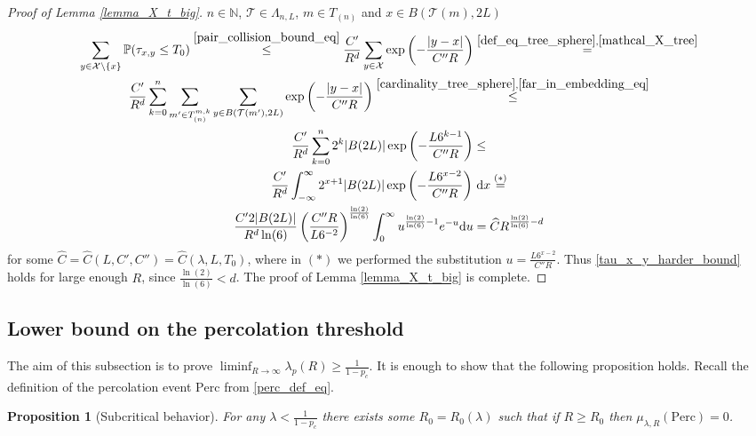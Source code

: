 \documentclass[a4paper,12pt]{article}
\newtheorem  {proposition}   [theorem]{Proposition}
\begin{document}
\begin{proof}[Proof of Lemma \ref{lemma_X_t_big}]
$n \in \mathbb{N}$, $\mathcal{T} \in \Lambda_{n,L}$, $m  \in T_{(n)}$ and  $x \in B( \mathcal{T}(m),2L)$
\begin{multline}\label{first_ln2_ln_6}
\sum_{y \in \mathcal{X}\setminus \{ x \} }   \mathbb{P}(\tau_{x,y} \leq T_0 ) \stackrel{ \eqref{pair_collision_bound_eq} }{\leq}
 \frac{C'}{R^{d}} \sum_{y \in \mathcal{X} }    \exp\left(  -  \frac{|y-x|}{C'' R } \right)
 \stackrel{ \eqref{def_eq_tree_sphere}, \eqref{mathcal_X_tree}  }{=}
  \\
\frac{C'}{R^{d}} \sum_{k=0}^n \sum_{m' \in T_{(n)}^{m,k} } \sum_{y \in B( \mathcal{T}(m'),2L)  }  \exp\left(  -  \frac{|y-x|}{C'' R } \right)
\stackrel{ \eqref{cardinality_tree_sphere}, \eqref{far_in_embedding_eq} }{\leq} \\
\frac{C'}{R^{d}} \sum_{k=0}^n 2^{k} |B(2L)|  \exp\left(  -  \frac{L 6^{k-1} }{C'' R } \right)
\leq \\
\frac{C' }{R^{d}} \int_{-\infty}^\infty 2^{x+1}|B(2L)|  \exp\left(  -  \frac{L 6^{x-2} }{C'' R } \right)\, \mathrm{d}x
 \stackrel{(*)}{=}\\
 \frac{C' 2 |B(2L)|}{R^d \ln(6)} \left( \frac{C'' R}{L 6^{-2}} \right)^{\frac{\ln(2)}{\ln(6)}}\int_0^\infty u^{ \frac{\ln(2)}{\ln(6)}-1}e^{-u}\mathrm{d}u=
  \widehat{C} R^{\frac{\ln(2)}{\ln(6)}-d}
\end{multline}
for some $\widehat{C}=\widehat{C}(L,C',C'')=\widehat{C}(\lambda,L,T_0)$, where in $(*)$ we performed the substitution
$u=\frac{L 6^{x-2} }{C'' R }$. Thus \eqref{tau_x_y_harder_bound}  holds for large enough $R$, since $\frac{\ln(2)}{\ln(6)} <d$.
The proof of Lemma \ref{lemma_X_t_big} is complete.
\end{proof}







\subsection{Lower bound on the percolation threshold}
\label{subsection_lower_bound}


The aim of this subsection is to prove $\liminf_{R \to \infty } \lambda_p(R) \geq \frac{1}{1-p_c}$.
 It is enough to  show that the following proposition holds. Recall the definition of the percolation event $\mathrm{Perc}$ from
\eqref{perc_def_eq}.
  \begin{proposition}[Subcritical behavior] \label{prop_subcrit}
  For any $\lambda < \frac{1}{1-p_c}$ there exists some $R_0=R_0(\lambda)$ such that if $R \geq R_0$ then $\mu_{\lambda,R}(\mathrm{Perc})=0$.
  \end{proposition}
\end{document}
